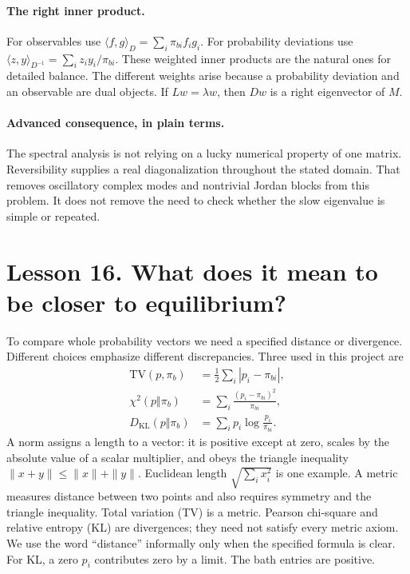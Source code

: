 \documentclass[11pt]{article}
\begin{document}
\paragraph{The right inner product.}
For observables use $\langle f,g\rangle_D=\sum_i\pi_{bi}f_i g_i$.
For probability deviations use
$\langle z,y\rangle_{D^{-1}}=\sum_i z_i y_i/\pi_{bi}$.
These weighted inner products are the natural ones for detailed balance.
The different weights arise because a probability deviation and an
observable are dual objects. If $Lw=\lambda w$, then $Dw$ is a right
eigenvector of $M$.

\paragraph{Advanced consequence, in plain terms.}
The spectral analysis is not relying on a lucky numerical property of one
matrix. Reversibility supplies a real diagonalization throughout the stated
domain. That removes oscillatory complex modes and nontrivial Jordan blocks
from this problem. It does not remove the need to check whether the slow
eigenvalue is simple or repeated.

\clearpage
\section*{Lesson 16. What does it mean to be closer to equilibrium?}
To compare whole probability vectors we need a specified distance or
divergence. Different choices emphasize different discrepancies. Three used
in this project are
\begin{align*}
\mathrm{TV}(p,\pi_b)&=\frac12\sum_i|p_i-\pi_{bi}|,\\
\chi^2(p\Vert\pi_b)&=\sum_i\frac{(p_i-\pi_{bi})^2}{\pi_{bi}},\\
D_{\mathrm{KL}}(p\Vert\pi_b)&=\sum_i p_i\log\frac{p_i}{\pi_{bi}}.
\end{align*}
A norm assigns a length to a vector: it is positive except at zero,
scales by the absolute value of a scalar multiplier, and obeys the triangle
inequality $\|x+y\|\leq\|x\|+\|y\|$. Euclidean length
$\sqrt{\sum_i x_i^2}$ is one example. A metric measures distance between
two points and also requires symmetry and the triangle inequality.
Total variation (TV) is a metric. Pearson chi-square and relative entropy
(KL) are divergences; they need not satisfy every metric axiom. We use the
word ``distance'' informally only when the specified formula is clear.
For KL, a zero $p_i$ contributes zero by a limit. The bath entries are positive.
\end{document}
